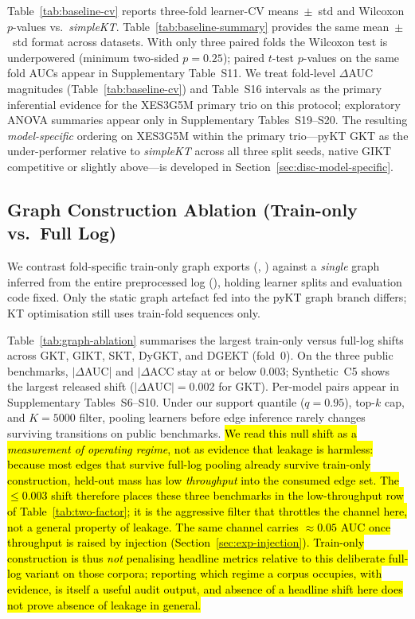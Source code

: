 \documentclass[pdflatex,sn-mathphys-num]{sn-jnl}
\newcommand{\rev}[1]{\hl{#1}}
\newcommand{\rev}[1]{#1}
\begin{document}

Table~\ref{tab:baseline-cv} reports three-fold learner-CV means~$\pm$~std and
Wilcoxon $p$-values vs.\ \textit{simpleKT}. Table~\ref{tab:baseline-summary}
provides the same mean~$\pm$~std format across datasets. With only three paired
folds the Wilcoxon test is underpowered (minimum two-sided $p{=}0.25$); paired
$t$-test $p$-values on the same fold AUCs appear in Supplementary Table~S11.
We treat fold-level $\Delta$AUC magnitudes (Table~\ref{tab:baseline-cv}) and
Table~S16 intervals as the primary inferential evidence for the XES3G5M primary
trio on this protocol; exploratory ANOVA summaries appear only in Supplementary
Tables~S19--S20. The resulting \emph{model-specific} ordering on XES3G5M within
the primary trio---pyKT GKT as the under-performer relative to
\textit{simpleKT} across all three split seeds, native GIKT competitive or
slightly above---is developed in Section~\ref{sec:disc-model-specific}.

\subsection{Graph Construction Ablation (Train-only vs.\ Full Log)}
\label{sec:exp-graph-ablation}
We contrast fold-specific train-only graph exports
(, ) against a
\emph{single} graph inferred from the entire preprocessed log
(), holding learner splits and
evaluation code fixed. Only the static graph artefact fed into the pyKT graph
branch differs; KT optimisation still uses train-fold sequences only.


Table~\ref{tab:graph-ablation} summarises the largest train-only versus
full-log shifts across GKT, GIKT, SKT, DyGKT, and DGEKT (fold~0).
On the three public benchmarks, $|\Delta$AUC| and $|\Delta$ACC stay at
or below $0.003$; Synthetic~C5 shows the largest released shift
($|\Delta\text{AUC}|{=}0.002$ for GKT). Per-model pairs appear in
Supplementary Tables~S6--S10. Under our support quantile ($q{=}0.95$),
top-$k$ cap, and $K{=}5000$ filter, pooling learners before edge inference
rarely changes surviving transitions on public benchmarks. \rev{We read this null
shift as a \emph{measurement of operating regime}, not as evidence that
leakage is harmless: because most edges that survive full-log pooling already
survive train-only construction, held-out mass has low \emph{throughput} into
the consumed edge set. The \mbox{${\leq}0.003$} shift therefore places these three
benchmarks in the low-throughput row of \mbox{Table~\ref{tab:two-factor}}; it is the
aggressive filter that throttles the channel here, not a general property of
leakage. The same channel carries \mbox{${\approx}0.05$} AUC once throughput is raised
by injection (\mbox{Section~\ref{sec:exp-injection}}). Train-only construction is
thus \emph{not} penalising headline metrics relative to this deliberate
full-log variant on those corpora; reporting which regime a corpus occupies,
with evidence, is itself a useful audit output, and absence of a headline
shift here does not prove absence of leakage in general.}
\end{document}

